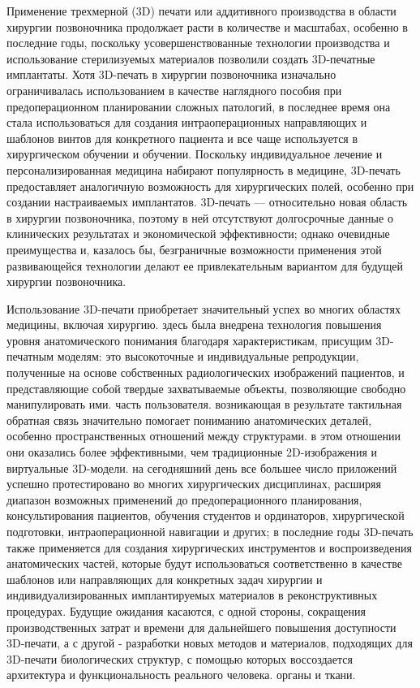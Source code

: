 Применение трехмерной (3D) печати или аддитивного производства в области
хирургии позвоночника продолжает расти в количестве и масштабах, особенно в
последние годы, поскольку усовершенствованные технологии производства и
использование стерилизуемых материалов позволили создать 3D-печатные имплантаты.
Хотя 3D-печать в хирургии позвоночника изначально ограничивалась использованием
в качестве наглядного пособия при предоперационном планировании сложных
патологий, в последнее время она стала использоваться для создания
интраоперационных направляющих и шаблонов винтов для конкретного пациента и все
чаще используется в хирургическом обучении и обучении. Поскольку индивидуальное
лечение и персонализированная медицина набирают популярность в медицине,
3D-печать предоставляет аналогичную возможность для хирургических полей,
особенно при создании настраиваемых имплантатов. 3D-печать — относительно новая
область в хирургии позвоночника, поэтому в ней отсутствуют долгосрочные данные о
клинических результатах и экономической эффективности; однако
очевидные преимущества и, казалось бы, безграничные возможности применения этой
развивающейся технологии делают ее привлекательным вариантом для будущей
хирургии позвоночника.\cite{sheha2019}

Использование 3D-печати приобретает значительный успех во многих областях
медицины, включая хирургию. здесь была внедрена технология повышения уровня
анатомического понимания благодаря характеристикам, присущим 3D-печатным
моделям: это высокоточные и индивидуальные репродукции, полученные на основе
собственных радиологических изображений пациентов, и представляющие собой
твердые захватываемые объекты, позволяющие свободно манипулировать ими. часть
пользователя. возникающая в результате тактильная обратная связь значительно
помогает пониманию анатомических деталей, особенно пространственных отношений
между структурами. в этом отношении они оказались более эффективными, чем
традиционные 2D-изображения и виртуальные 3D-модели. на сегодняшний день все
большее число приложений успешно протестировано во многих хирургических
дисциплинах, расширяя диапазон возможных применений до предоперационного
планирования, консультирования пациентов, обучения студентов и ординаторов,
хирургической подготовки, интраоперационной навигации и других; в последние годы
3D-печать также применяется для создания хирургических инструментов и
воспроизведения анатомических частей, которые будут использоваться
соответственно в качестве шаблонов или направляющих для конкретных задач
хирургии и индивидуализированных имплантируемых материалов в реконструктивных
процедурах. Будущие ожидания касаются, с одной стороны, сокращения
производственных затрат и времени для дальнейшего повышения доступности
3D-печати, а с другой - разработки новых методов и материалов, подходящих для
3D-печати биологических структур, с помощью которых воссоздается архитектура и
функциональность реального человека. органы и ткани.\cite{pugliese2018}


